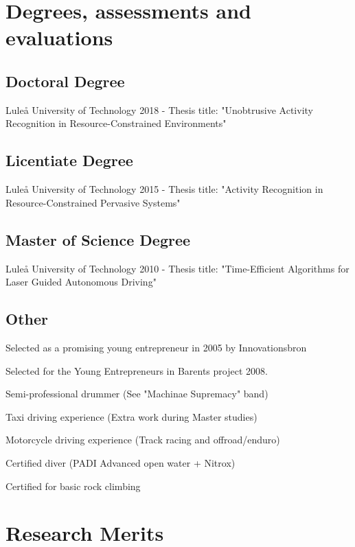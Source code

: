 \documentclass{article}
\begin{document}
\newpage

\section{Degrees, assessments and evaluations}
\subsection{Doctoral Degree}
Luleå University of Technology 2018 - Thesis title: "Unobtrusive Activity Recognition in Resource-Constrained Environments" \\

\subsection{Licentiate Degree}
Luleå University of Technology 2015 - Thesis title: "Activity Recognition in Resource-Constrained Pervasive Systems" \\

\subsection{Master of Science Degree}
Luleå University of Technology 2010 - Thesis title: "Time-Efficient Algorithms for Laser Guided Autonomous Driving" \\

\subsection{Other}
\begin{description}
\item Selected as a promising young entrepreneur in 2005 by Innovationsbron
\item Selected for the Young Entrepreneurs in Barents project 2008.
\item Semi-professional drummer (See "Machinae Supremacy" band)
\item Taxi driving experience (Extra work during Master studies)
\item Motorcycle driving experience (Track racing and offroad/enduro)
\item Certified diver (PADI Advanced open water + Nitrox)
\item Certified for basic rock climbing
\end{description}


\newpage

\section{Research Merits}
\end{document}
